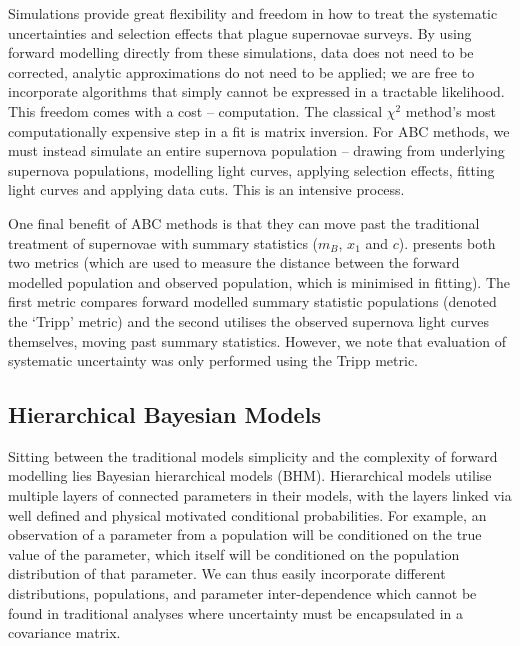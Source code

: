 \documentclass[a4paper,fleqn,usenatbib]{mnras}
\begin{document}
Simulations provide great flexibility and freedom in how to treat the systematic uncertainties and selection effects that plague supernovae surveys. By using forward modelling directly from these simulations, data does not need to be corrected, analytic approximations do not need to be applied; we are free to incorporate algorithms that simply cannot be expressed in a tractable likelihood. This freedom comes with a cost -- computation. The classical $\chi^2$ method's most computationally expensive step in a fit is matrix inversion. For ABC methods, we must instead simulate an entire supernova population -- drawing from underlying supernova populations, modelling light curves, applying selection effects, fitting light curves and applying data cuts. This is an intensive process.

One final benefit of ABC methods is that they can move past the traditional treatment of supernovae with summary statistics ($m_B$, $x_1$ and $c$). \citet{Jennings2016} presents both two metrics (which are used to measure the distance between the forward modelled population and observed population, which is minimised in fitting). The first metric compares forward modelled summary statistic populations (denoted the `Tripp' metric) and the second utilises the observed supernova light curves themselves, moving past summary statistics. However, we note that evaluation of systematic uncertainty was only performed using the Tripp metric.

\subsection{Hierarchical Bayesian Models}

Sitting between the traditional models simplicity and the complexity of forward modelling lies Bayesian hierarchical models (BHM). Hierarchical models utilise multiple layers of connected parameters in their models, with the layers linked via well defined and physical motivated conditional probabilities. For example, an observation of a parameter from a population will be conditioned on the true value of the parameter, which itself will be conditioned on the population distribution of that parameter. We can thus easily incorporate different distributions, populations, and parameter inter-dependence which cannot be found in traditional analyses where uncertainty must be encapsulated in a covariance matrix.
\end{document}
